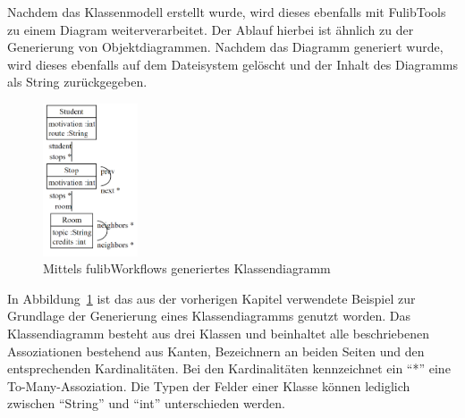 Nachdem das Klassenmodell erstellt wurde, wird dieses ebenfalls mit FulibTools zu einem Diagram weiterverarbeitet.
Der Ablauf hierbei ist ähnlich zu der Generierung von Objektdiagrammen.
Nachdem das Diagramm generiert wurde, wird dieses ebenfalls auf dem Dateisystem gelöscht und der Inhalt des Diagramms als String zurückgegeben.

\begin{figure}[h]
    \centering
    \includegraphics[width=0.25\textwidth]{images/3.1.4/class_diagram}
    \caption{Mittels fulibWorkflows generiertes Klassendiagramm}
    \label{fig:generated-class}
\end{figure}

In Abbildung~\ref{fig:generated-class} ist das aus der vorherigen Kapitel verwendete Beispiel zur Grundlage der Generierung eines Klassendiagramms genutzt worden.
Das Klassendiagramm besteht aus drei Klassen und beinhaltet alle beschriebenen Assoziationen bestehend aus Kanten, Bezeichnern an beiden Seiten und den entsprechenden
Kardinalitäten.
Bei den Kardinalitäten kennzeichnet ein ``*'' eine To-Many-Assoziation.
Die Typen der Felder einer Klasse können lediglich zwischen ``String'' und ``int'' unterschieden werden.
